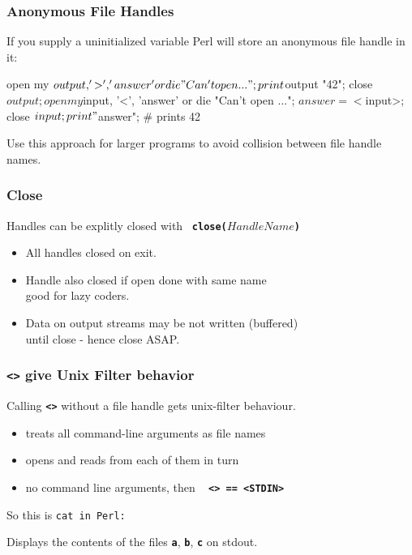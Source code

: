 \begin{frame}
\frametitle{Anonymous File Handles}

If you supply a uninitialized variable Perl will 
store  an anonymous file handle in it:

\begin{perl}
open my $output, '>', 'answer' or die "Can't open ...";
print $output "42\n";
close $output;
open my $input, '<', 'answer' or die "Can't open ...";
$answer = <$input>;
close $input;
print "$answer\n"; # prints 42
\end{perl}

Use this approach for larger programs to avoid
collision between file handle names.

\end{frame}

\begin{frame}
\frametitle{Close}

Handles can be explitly closed with ~\textbf{\tt{close(}}$HandleName$\textbf{\tt{)}}

\begin{itemize}
\item
All handles closed on exit.
\item
Handle also closed if open done with same name \\
good for lazy coders.
\item
Data on output streams may be not written (buffered) \\
until close - hence close  ASAP.
\end{itemize}

\end{frame}

\begin{frame}
\frametitle{\textbf{\tt{{\textless}>}} give Unix Filter behavior}
Calling \textbf{\tt{{\textless}>}} without a file handle gets unix-filter behaviour.
\begin{itemize}
\item  treats all command-line arguments as file names
\item  opens and reads from each of them in turn
\item  no command line arguments, then ~ \textbf{\tt{{\textless}> == {\textless}STDIN>}}
\end{itemize}

So this is \tt{cat} in Perl:

\begin{perl}
\end{perl}

Displays the contents of the files \textbf{\tt{a}}, \textbf{\tt{b}}, \textbf{\tt{c}} on stdout.
\end{frame}


